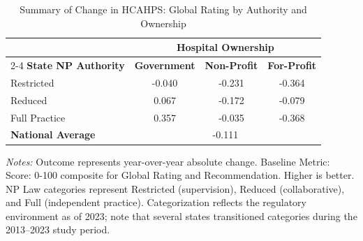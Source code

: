 \begin{table}[htbp]
    \centering
    \caption{Summary of Change in HCAHPS: Global Rating by Authority and Ownership}
    \label{tab:d_hcahps_grp4}
    \vspace{0.2cm}
    \begin{tabular}{lccc}
        \toprule
        & \multicolumn{3}{c}{\textbf{Hospital Ownership}} \\
        \cmidrule(lr){2-4}
        \textbf{State NP Authority} & \textbf{Government} & \textbf{Non-Profit} & \textbf{For-Profit} \\
        \midrule
        Restricted & -0.040 & -0.231 & -0.364 \\
        Reduced & 0.067 & -0.172 & -0.079 \\
        Full Practice & 0.357 & -0.035 & -0.368 \\
        \midrule
        \textbf{National Average} & \multicolumn{3}{c}{-0.111} \\
        \bottomrule
    \end{tabular}
    \vspace{0.1cm}
    \begin{minipage}{0.85\textwidth}
        \footnotesize \textit{Notes:} Outcome represents year-over-year absolute change. Baseline Metric: Score: 0-100 composite for Global Rating and Recommendation. Higher is better. NP Law categories represent Restricted (supervision), Reduced (collaborative), and Full (independent practice). Categorization reflects the regulatory environment as of 2023; note that several states transitioned categories during the 2013--2023 study period.
    \end{minipage}
\end{table}